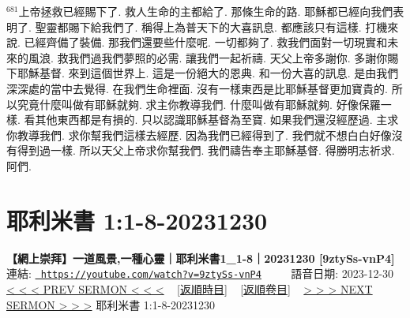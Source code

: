 \documentclass{book}
\begin{document}
$^{681}$上帝拯救已經賜下了.
救人生命的主都給了.
那條生命的路.
耶穌都已經向我們表明了.
聖靈都賜下給我們了.
稱得上為普天下的大喜訊息.
都應該只有這樣.
打機來說.
已經齊備了裝備.
那我們還要些什麼呢.
一切都夠了.
救我們面對一切現實和未來的風浪.
救我們過我們夢照的必需.
讓我們一起祈禱.
天父上帝多謝你.
多謝你賜下耶穌基督.
來到這個世界上.
這是一份絕大的恩典.
和一份大喜的訊息.
是由我們深深處的當中去覺得.
在我們生命裡面.
沒有一樣東西是比耶穌基督更加寶貴的.
所以究竟什麼叫做有耶穌就夠.
求主你教導我們.
什麼叫做有耶穌就夠.
好像保羅一樣.
看其他東西都是有損的.
只以認識耶穌基督為至寶.
如果我們還沒經歷過.
主求你教導我們.
求你幫我們這樣去經歷.
因為我們已經得到了.
我們就不想白白好像沒有得到過一樣.
所以天父上帝求你幫我們.
我們禱告奉主耶穌基督.
得勝明志祈求.
阿們.
\newpage



\section{耶利米書 1:1-8-20231230}
\label{sec:9ztySs_vnP4}
\textbf{【網上崇拜】一道風景,一種心靈｜耶利米書1\_1-8｜20231230 [9ztySs-vnP4]}
\newline
\newline
連結: \href{https://youtube.com/watch?v=9ztySs-vnP4}{\texttt{ https://youtube.com/watch?v=9ztySs-vnP4}} ~~~~ 語音日期: 2023-12-30 
\newline
\newline
\hyperref[sec:dT3dN2jF8BQ]{\small{< < < PREV SERMON < < <}}
~
\hyperref[sec:index_chronic]{\small{[返順時目]}}
~
\hyperref[sec:index_scriptual]{\small{[返順卷目]}}
~
\hyperref[sec:code]{\small{> > > NEXT SERMON > > >}}
\newline
\newline
耶利米書 1:1-8-20231230
\newline
\end{document}
